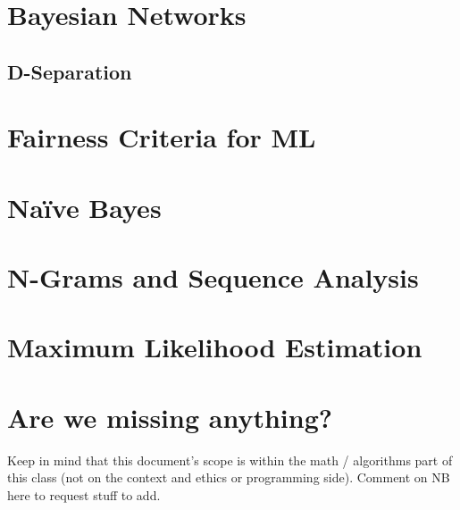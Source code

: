 \documentclass{tufte-handout}
\begin{document}
\section{Bayesian Networks}

\subsection{D-Separation}

\section{Fairness Criteria for ML}

\section{Na\"ive Bayes}

\section{N-Grams and Sequence Analysis}

\section{Maximum Likelihood Estimation}

\section{Are we missing anything?}
Keep in mind that this document's scope is within the math / algorithms part of this class (not on the context and ethics or programming side).  Comment on NB here to request stuff to add. 
\end{document}
